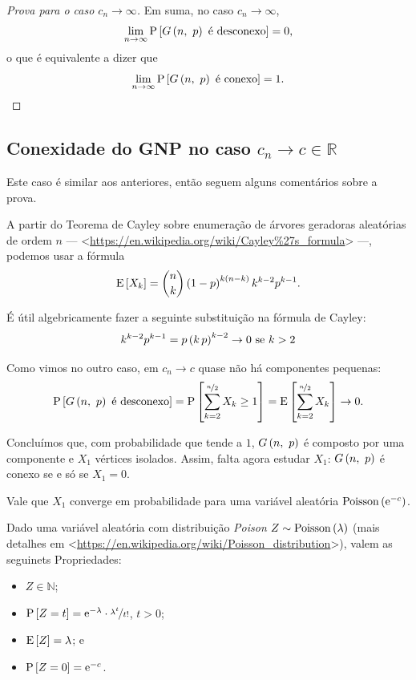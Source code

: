 \begin{proof}[Prova para o caso $c_n\rightarrow\infty$]
  Em suma, no caso $c_n\rightarrow\infty$,
  \[
    \lim_{n\rightarrow\infty} \mathrm{P}\left[G\left(n,\ p\vphantom{1j}\right)\text{ é desconexo}\vphantom{1j}\right] = 0,
  \]
  o que é equivalente a dizer que
  \[
    \lim_{n\rightarrow\infty} \mathrm{P}\left[G\left(n,\ p\vphantom{1j}\right)\text{ é conexo}\vphantom{1j}\right] = 1.
  \]
\end{proof}

\subsection{Conexidade do GNP no caso $c_n\rightarrow c\in\mathds{R}$}

Este caso é similar aos anteriores, então seguem alguns comentários sobre a prova.

A partir do Teorema de Cayley sobre enumeração de árvores geradoras aleatórias de ordem $n$ --- <\href{https://en.wikipedia.org/wiki/Cayley%27s_formula}{https://en.wikipedia.org/wiki/Cayley\%27s\_formula}> ---, podemos usar a fórmula
\[
  \mathrm{E}\left[X_k\vphantom{1j}\right] = \binom{n}{k} \left(1-p\vphantom{1j}\right)^{k\left(n-k\vphantom{1j}\right)} k^{k-2} p^{k-1}.
\]

É útil algebricamente fazer a seguinte substituição na fórmula de Cayley:
\[
  k^{k-2} p^{k-1} = p\left(k\,p\vphantom{1j}\right)^{k-2} \rightarrow 0 \text{ se } k>2
\]

Como vimos no outro caso, em $c_n\rightarrow c$ quase não há componentes pequenas:
\[
  \mathrm{P}\left[G\left(n,\ p\vphantom{1j}\right)\text{ é desconexo}\vphantom{1j}\right] =
  \mathrm{P}\left[\sum_{k=2}^{\nicefrac{n}{2}} X_k \geq 1\vphantom{1j}\right] = \mathrm{E}\left[\sum_{k=2}^{\nicefrac{n}{2}} X_k\vphantom{1j}\right] \rightarrow 0.
\]

Concluímos que, com probabilidade que tende a $1$, $G\left(n,\ p\vphantom{1j}\right)$ é composto por uma componente e $X_1$ vértices isolados. Assim, falta agora estudar $X_1$: $G\left(n,\ p\vphantom{1j}\right)$ é conexo se e só se $X_1=0$.

\begin{fato}
  Vale que $X_1$ converge em probabilidade para uma variável aleatória $\mathrm{Poisson}\left(\mathrm{e}^{-c}\vphantom{1j}\right)$.
\end{fato}

Dado uma variável aleatória com distribuição \textit{Poison} $Z\sim\mathrm{Poisson}\left(\lambda\vphantom{1j}\right)$ (mais detalhes em <\href{https://en.wikipedia.org/wiki/Poisson_distribution}{https://en.wikipedia.org/wiki/Poisson\_distribution}>), valem as seguinets Propriedades:
\begin{itemize}
  \item $Z\in\mathds{N}$;
  \item $\mathrm{P}\left[Z=t\vphantom{1j}\right] = \mathrm{e}^{-\lambda}\cdot\nicefrac{\lambda^t}{t!}$, $t>0$;
  \item $\mathrm{E}\left[Z\vphantom{1j}\right] = \lambda$; e 
  \item $\mathrm{P}\left[Z=0\vphantom{1j}\right] = \mathrm{e}^{-c}$.
\end{itemize}

